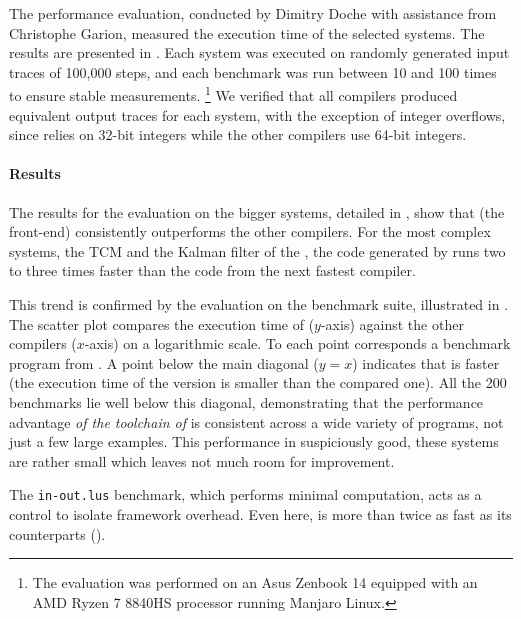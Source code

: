 The performance evaluation, conducted by Dimitry Doche with assistance from Christophe Garion,
measured the execution time of the selected systems. The results are presented in
. Each system was executed on
randomly generated input traces of 100,000 steps, and each benchmark was run between 10 and 100
times to ensure stable measurements.%
\footnote{
    The evaluation was performed on an Asus Zenbook 14 equipped with an AMD Ryzen 7 8840HS processor
    running Manjaro Linux.
}
We verified that all compilers produced equivalent output traces for each system, with the exception
of integer overflows, since \LustreC relies on 32-bit integers while the other compilers use 64-bit
integers.

\paragraph{Results}
The results for the evaluation on the bigger systems, detailed in
, show that \GRSync
(\via the \GLustre front-end) consistently outperforms the other compilers. For the most complex
systems, the TCM and the Kalman filter of the \crazyflie, the code generated by \GRSync runs two to
three times faster than the code from the next fastest compiler.

This trend is confirmed by the evaluation on the \Kind benchmark suite, illustrated in
. The scatter plot
compares the execution time of \GRSync ($y$-axis) against the other compilers ($x$-axis) on a
logarithmic scale. To each point corresponds a benchmark program from \Kind. A point below the main
diagonal ($y=x$) indicates that \GRSync is faster (the execution time of the \GRSync version
is smaller than the compared one). All the 200 benchmarks lie well below this diagonal,
demonstrating that the performance advantage \emph{of the toolchain of \GRSync} is consistent across
a wide variety of programs, not just a few large examples. This performance in suspiciously good,
these systems are rather small which leaves not much room for improvement.

The \texttt{in-out.lus} benchmark, which performs minimal computation, acts as a control to isolate
framework overhead. Even here, \GRSync is more than twice as fast as its counterparts
(\cf {}).

